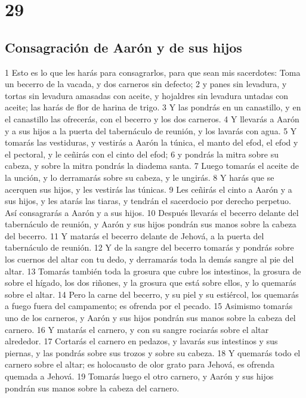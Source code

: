 \chapter{29}

\section*{Consagración de Aarón y de sus hijos}

1 Esto es lo que les harás para consagrarlos, para que sean mis sacerdotes: Toma un becerro de la vacada, y dos carneros sin defecto;
2 y panes sin levadura, y tortas sin levadura amasadas con aceite, y hojaldres sin levadura untadas con aceite; las harás de flor de harina de trigo.
3 Y las pondrás en un canastillo, y en el canastillo las ofrecerás, con el becerro y los dos carneros.
4 Y llevarás a Aarón y a sus hijos a la puerta del tabernáculo de reunión, y los lavarás con agua.
5 Y tomarás las vestiduras, y vestirás a Aarón la túnica, el manto del efod, el efod y el pectoral, y le ceñirás con el cinto del efod;
6 y pondrás la mitra sobre su cabeza, y sobre la mitra pondrás la diadema santa.
7 Luego tomarás el aceite de la unción, y lo derramarás sobre su cabeza, y le ungirás.
8 Y harás que se acerquen sus hijos, y les vestirás las túnicas.
9 Les ceñirás el cinto a Aarón y a sus hijos, y les atarás las tiaras, y tendrán el sacerdocio por derecho perpetuo. Así consagrarás a Aarón y a sus hijos.
10 Después llevarás el becerro delante del tabernáculo de reunión, y Aarón y sus hijos pondrán sus manos sobre la cabeza del becerro.
11 Y matarás el becerro delante de Jehová, a la puerta del tabernáculo de reunión.
12 Y de la sangre del becerro tomarás y pondrás sobre los cuernos del altar con tu dedo, y derramarás toda la demás sangre al pie del altar.
13 Tomarás también toda la grosura que cubre los intestinos, la grosura de sobre el hígado, los dos riñones, y la grosura que está sobre ellos, y lo quemarás sobre el altar.
14 Pero la carne del becerro, y su piel y su estiércol, los quemarás a fuego fuera del campamento; es ofrenda por el pecado.
15 Asimismo tomarás uno de los carneros, y Aarón y sus hijos pondrán sus manos sobre la cabeza del carnero.
16 Y matarás el carnero, y con su sangre rociarás sobre el altar alrededor.
17 Cortarás el carnero en pedazos, y lavarás sus intestinos y sus piernas, y las pondrás sobre sus trozos y sobre su cabeza.
18 Y quemarás todo el carnero sobre el altar; es holocausto de olor grato  para Jehová, es ofrenda quemada a Jehová.
19 Tomarás luego el otro carnero, y Aarón y sus hijos pondrán sus manos sobre la cabeza del carnero.
